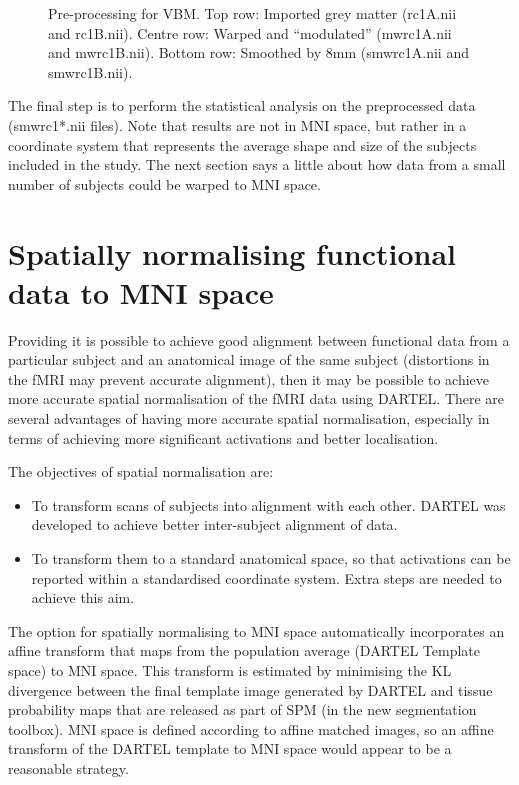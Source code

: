 \begin{figure}
\begin{center}
\end{center}
\caption{
Pre-processing for VBM.
Top row: Imported grey matter (rc1A.nii and rc1B.nii).
Centre row: Warped and ``modulated'' (mwrc1A.nii and mwrc1B.nii).
Bottom row: Smoothed by 8mm (smwrc1A.nii and smwrc1B.nii).
\label{Fig:VBM}}
\end{figure}

The final step is to perform the statistical analysis on the preprocessed data (smwrc1*.nii files).
Note that results are not in MNI space, but rather in a coordinate system that represents the average shape and size of the subjects included in the study.
The next section says a little about how data from a small number of subjects could be warped to MNI space.



\section{Spatially normalising functional data to MNI space}
Providing it is possible to achieve good alignment between functional data from a particular subject and an anatomical image of the same subject (distortions in the fMRI may prevent accurate alignment), then it may be possible to achieve more accurate spatial normalisation of the fMRI data using DARTEL.
There are several advantages of having more accurate spatial normalisation, especially in terms of achieving more significant activations and better localisation.

The objectives of spatial normalisation are:
\begin{itemize}
\item{To transform scans of subjects into alignment with each other.
DARTEL was developed to achieve better inter-subject alignment of data.
}
\item{To transform them to a standard anatomical space, so that activations can be reported within a standardised coordinate system.
Extra steps are needed to achieve this aim.
}
\end{itemize}

The option for spatially normalising to MNI space automatically incorporates an affine transform that maps from the population average (DARTEL Template space) to MNI space.
This transform is estimated by minimising the KL divergence between the final template image generated by DARTEL and tissue probability maps that are released as part of SPM (in the new segmentation toolbox).  MNI space is defined according to affine matched images, so an affine transform of the DARTEL template to MNI space would appear to be a reasonable strategy.

